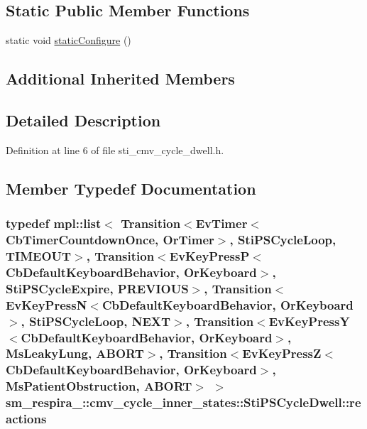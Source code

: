 \subsection*{Static Public Member Functions}
\begin{DoxyCompactItemize}
\item 
static void \hyperlink{structsm__respira__1_1_1cmv__cycle__inner__states_1_1StiPSCycleDwell_affbf6e274207cc248d0ad59d0177172c}{static\+Configure} ()
\end{DoxyCompactItemize}
\subsection*{Additional Inherited Members}


\subsection{Detailed Description}


Definition at line 6 of file sti\+\_\+cmv\+\_\+cycle\+\_\+dwell.\+h.



\subsection{Member Typedef Documentation}
\subsubsection[{\texorpdfstring{reactions}{reactions}}]{\setlength{\rightskip}{0pt plus 5cm}typedef mpl\+::list$<$ Transition$<$Ev\+Timer$<$Cb\+Timer\+Countdown\+Once, {\bf Or\+Timer}$>$, {\bf Sti\+P\+S\+Cycle\+Loop}, {\bf T\+I\+M\+E\+O\+UT}$>$, Transition$<$Ev\+Key\+PressP$<$Cb\+Default\+Keyboard\+Behavior, {\bf Or\+Keyboard}$>$, {\bf Sti\+P\+S\+Cycle\+Expire}, {\bf P\+R\+E\+V\+I\+O\+US}$>$, Transition$<$Ev\+Key\+PressN$<$Cb\+Default\+Keyboard\+Behavior, {\bf Or\+Keyboard}$>$, {\bf Sti\+P\+S\+Cycle\+Loop}, {\bf N\+E\+XT}$>$, Transition$<$Ev\+Key\+PressY$<$Cb\+Default\+Keyboard\+Behavior, {\bf Or\+Keyboard}$>$, {\bf Ms\+Leaky\+Lung}, {\bf A\+B\+O\+RT}$>$, Transition$<$Ev\+Key\+PressZ$<$Cb\+Default\+Keyboard\+Behavior, {\bf Or\+Keyboard}$>$, {\bf Ms\+Patient\+Obstruction}, {\bf A\+B\+O\+RT}$>$ $>$ {\bf sm\+\_\+respira\+\_\+::cmv\+\_\+cycle\+\_\+inner\+\_\+states\+::\+Sti\+P\+S\+Cycle\+Dwell\+::reactions}}\hypertarget{structsm__respira__1_1_1cmv__cycle__inner__states_1_1StiPSCycleDwell_a393e74db3d401609684a11fb37bd23ce}{}\label{structsm__respira__1_1_1cmv__cycle__inner__states_1_1StiPSCycleDwell_a393e74db3d401609684a11fb37bd23ce}


